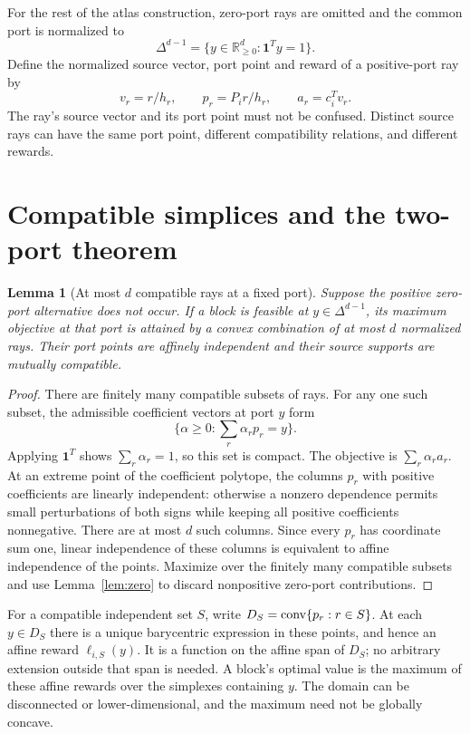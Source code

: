 \documentclass[11pt,a4paper]{article}
\newtheorem{lemma}[theorem]{Lemma}
\theoremstyle{definition}
\theoremstyle{remark}
\newcommand{\R}{\mathbb R}\newcommand{\Q}{\mathbb Q}\newcommand{\Z}{\mathbb Z}
\newcommand{\one}{\mathbf1}\newcommand{\code}[1]{\texttt{\detokenize{#1}}}
\begin{document}
For the rest of the atlas construction, zero-port rays are omitted and the common port is normalized to
\[
 \Delta^{d-1}=\{y\in\R^d_{\ge0}:\one^Ty=1\}.
\]
Define the normalized source vector, port point and reward of a positive-port ray by
\begin{equation}
 v_r=r/h_r,\qquad p_r=P_i r/h_r,\qquad a_r=c_i^Tv_r.
 \label{eq:normalize}
\end{equation}
The ray's source vector and its port point must not be confused. Distinct source rays can have the same port point, different compatibility relations, and different rewards.

\section{Compatible simplices and the two-port theorem}
\label{sec:two}

\begin{lemma}[At most $d$ compatible rays at a fixed port]
\label{lem:simplex}
Suppose the positive zero-port alternative does not occur. If a block is feasible at $y\in\Delta^{d-1}$, its maximum objective at that port is attained by a convex combination of at most $d$ normalized rays. Their port points are affinely independent and their source supports are mutually compatible.
\end{lemma}
\begin{proof}
There are finitely many compatible subsets of rays. For any one such subset, the admissible coefficient vectors at port $y$ form
\[
 \{\alpha\ge0:\sum_r\alpha_rp_r=y\}.
\]
Applying $\one^T$ shows $\sum_r\alpha_r=1$, so this set is compact. The objective is $\sum_r\alpha_ra_r$. At an extreme point of the coefficient polytope, the columns $p_r$ with positive coefficients are linearly independent: otherwise a nonzero dependence permits small perturbations of both signs while keeping all positive coefficients nonnegative. There are at most $d$ such columns. Since every $p_r$ has coordinate sum one, linear independence of these columns is equivalent to affine independence of the points. Maximize over the finitely many compatible subsets and use Lemma~\ref{lem:zero} to discard nonpositive zero-port contributions.
\end{proof}

For a compatible independent set $S$, write $D_S=\operatorname{conv}\{p_r:r\in S\}$. At each $y\in D_S$ there is a unique barycentric expression in these points, and hence an affine reward $\ell_{i,S}(y)$. It is a function on the affine span of $D_S$; no arbitrary extension outside that span is needed. A block's optimal value is the maximum of these affine rewards over the simplexes containing $y$. The domain can be disconnected or lower-dimensional, and the maximum need not be globally concave.
\end{document}
